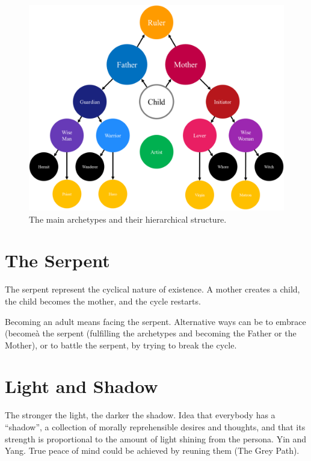 \documentclass[]{book}
\begin{document}
\begin{figure}

{\centering \includegraphics[width=\textwidth]{img/archetypes} 

}

\caption{The main archetypes and their hierarchical structure.}\label{fig:unnamed-chunk-3}
\end{figure}

\hypertarget{the-serpent}{%
\section{The Serpent}\label{the-serpent}}

The serpent represent the cyclical nature of existence. A mother creates a child, the child becomes the mother, and the cycle restarts.

Becoming an adult means facing the serpent. Alternative ways can be to embrace (becomeà the serpent (fulfilling the archetypes and becoming the Father or the Mother), or to battle the serpent, by trying to break the cycle.

\hypertarget{light-and-shadow}{%
\section{Light and Shadow}\label{light-and-shadow}}

The stronger the light, the darker the shadow.
Idea that everybody has a ``shadow'', a collection of morally reprehensible desires and thoughts, and that its strength is proportional to the amount of light shining from the persona. Yin and Yang. True peace of mind could be achieved by reuning them (The Grey Path).
\end{document}
